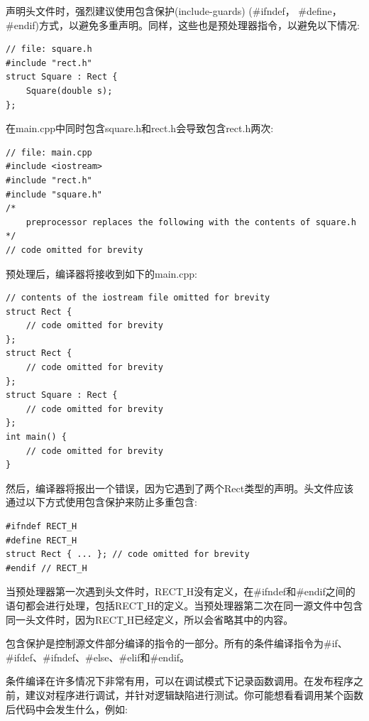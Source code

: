 声明头文件时，强烈建议使用包含保护(include-guards) (\#ifndef， \#define， \#endif)方式，以避免多重声明。同样，这些也是预处理器指令，以避免以下情况:\par

\begin{lstlisting}[caption={}]
// file: square.h
#include "rect.h"
struct Square : Rect {
	Square(double s);
};
\end{lstlisting}

在main.cpp中同时包含square.h和rect.h会导致包含rect.h两次: \par

\begin{lstlisting}[caption={}]
// file: main.cpp
#include <iostream>
#include "rect.h"
#include "square.h"
/*
	preprocessor replaces the following with the contents of square.h
*/
// code omitted for brevity
\end{lstlisting}

预处理后，编译器将接收到如下的main.cpp: \par

\begin{lstlisting}[caption={}]
// contents of the iostream file omitted for brevity
struct Rect {
	// code omitted for brevity
};
struct Rect {
	// code omitted for brevity
};
struct Square : Rect {
	// code omitted for brevity
};
int main() {
	// code omitted for brevity
}
\end{lstlisting}

然后，编译器将报出一个错误，因为它遇到了两个Rect类型的声明。头文件应该通过以下方式使用包含保护来防止多重包含: \par

\begin{lstlisting}[caption={}]
#ifndef RECT_H
#define RECT_H
struct Rect { ... }; // code omitted for brevity
#endif // RECT_H
\end{lstlisting}

当预处理器第一次遇到头文件时，RECT\underline{ }H没有定义，在\#ifndef和\#endif之间的语句都会进行处理，包括RECT\underline{ }H的定义。当预处理器第二次在同一源文件中包含同一头文件时，因为RECT\underline{ }H已经定义，所以会省略其中的内容。 \par
包含保护是控制源文件部分编译的指令的一部分。所有的条件编译指令为\#if、\#ifdef、\#ifndef、\#else、\#elif和\#endif。\par
条件编译在许多情况下非常有用，可以在调试模式下记录函数调用。在发布程序之前，建议对程序进行调试，并针对逻辑缺陷进行测试。你可能想看看调用某个函数后代码中会发生什么，例如: \par

